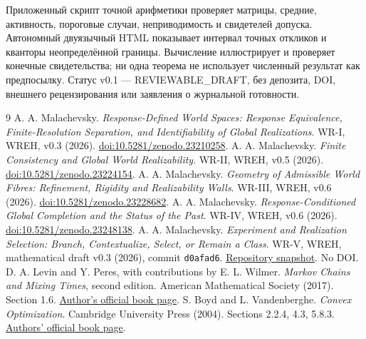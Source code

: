 {Приложенный скрипт точной арифметики проверяет матрицы, средние, активность, пороговые случаи, неприводимость и свидетелей допуска. Автономный двуязычный HTML показывает интервал точных откликов и кванторы неопределённой границы. Вычисление иллюстрирует и проверяет конечные свидетельства; ни одна теорема не использует численный результат как предпосылку. Статус v0.1 --- REVIEWABLE\_DRAFT, без депозита, DOI, внешнего рецензирования или заявления о журнальной готовности.}

\begingroup\raggedright
\begin{thebibliography}{9}
 A. A. Malachevsky. \emph{Response-Defined World Spaces: Response Equivalence, Finite-Resolution Separation, and Identifiability of Global Realizations}. WR-I, WREH, v0.3 (2026). \href{https://doi.org/10.5281/zenodo.23210258}{doi:10.5281/zenodo.23210258}.
 A. A. Malachevsky. \emph{Finite Consistency and Global World Realizability}. WR-II, WREH, v0.5 (2026). \href{https://doi.org/10.5281/zenodo.23224154}{doi:10.5281/zenodo.23224154}.
 A. A. Malachevsky. \emph{Geometry of Admissible World Fibres: Refinement, Rigidity and Realizability Walls}. WR-III, WREH, v0.6 (2026). \href{https://doi.org/10.5281/zenodo.23228682}{doi:10.5281/zenodo.23228682}.
 A. A. Malachevsky. \emph{Response-Conditioned Global Completion and the Status of the Past}. WR-IV, WREH, v0.6 (2026). \href{https://doi.org/10.5281/zenodo.23248138}{doi:10.5281/zenodo.23248138}.
 A. A. Malachevsky. \emph{Experiment and Realization Selection: Branch, Contextualize, Select, or Remain a Class}. WR-V, WREH, mathematical draft v0.3 (2026), commit \texttt{d0afad6}. \href{https://github.com/AIDevelopersMonster/WREH/tree/d0afad65108abee8b561e02af6fe3392c6057487/papers/WR-V/draft-v0.3}{Repository snapshot}. No DOI.
 D. A. Levin and Y. Peres, with contributions by E. L. Wilmer. \emph{Markov Chains and Mixing Times}, second edition. American Mathematical Society (2017). Section 1.6. \href{https://pages.uoregon.edu/dlevin/MARKOV/}{Author's official book page}.
 S. Boyd and L. Vandenberghe. \emph{Convex Optimization}. Cambridge University Press (2004). Sections 2.2.4, 4.3, 5.8.3. \href{https://web.stanford.edu/~boyd/cvxbook/}{Authors' official book page}.
\end{thebibliography}\endgroup
